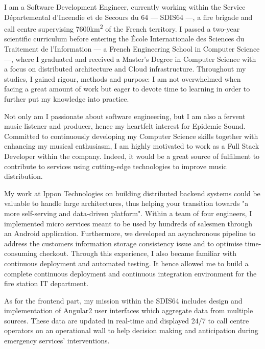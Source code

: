 \documentclass[11pt, a4paper]{awesome-cv}
\begin{document}

  \makelettertitle

  \begin{cvletter}
    I am a Software Development Engineer, currently working within the Service Départemental d’Incendie et de Secours du 64 --- SDIS64 ---,
    a fire brigade and call centre supervising 7600km\textsuperscript{2} of the French territory.
    I passed a two-year scientific curriculum before entering the École Internationale des Sciences du Traitement de l’Information ---
    a French Engineering School in Computer Science ---, where I graduated and received
    a Master's Degree in Computer Science with a focus on distributed architecture and Cloud infrastructure.
    Throughout my studies, I gained rigour, methods and purpose:
    I am not overwhelmed when facing a great amount of work but eager to devote time to learning in order to further put my knowledge into practice.
    \medskip

    Not only am I passionate about software engineering, but I am also a fervent music listener and producer, hence my heartfelt interest for Epidemic Sound.
    Committed to continuously developing my Computer Science skills together with enhancing my musical enthusiasm,
    I am highly motivated to work as a Full Stack Developer within the company.
    Indeed, it would be a great source of fulfilment to contribute to services using cutting-edge technologies to improve music distribution.
    \medskip

    My work at Ippon Technologies on building distributed backend systems could be valuable to handle large architectures,
    thus helping your transition towards "a more self-serving and data-driven platform".
    Within a team of four engineers, I implemented micro services meant to be used by hundreds of salesmen through an Android application.
    Furthermore, we developed an asynchronous pipeline to address the customers information storage consistency issue
    and to optimise time-consuming checkout.
    Through this experience, I also became familiar with continuous deployment and automated testing.
    It hence allowed me to build a complete continuous deployment and continuous integration environment for the fire station IT department.

    As for the frontend part, my mission within the SDIS64 includes design and implementation of Angular2 user interfaces
    which aggregate data from multiple sources.
    These data are updated in real-time and displayed 24/7 to call centre operators on an operational wall to help decision making
    and anticipation during emergency services' interventions.
    \medskip


\end{cvletter}
\end{document}
